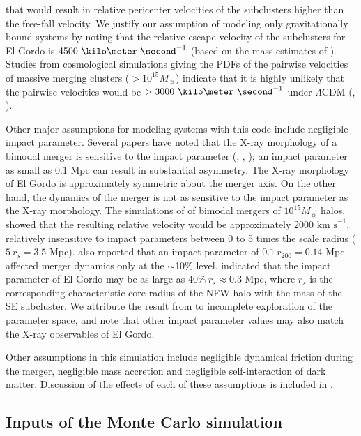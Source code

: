 that would result in relative pericenter velocities of the subclusters
higher than the free-fall velocity. We justify our assumption of
modeling only gravitationally bound systems by noting that the relative escape
velocity of the subclusters for El Gordo is
$4500~\kilo\meter~\second^{-1}$ (based on the mass estimates of
\cite{Jee13}). Studies from cosmological simulations giving the PDFs of the pairwise
velocities of massive merging clusters ($>10^{15} M_{\sun}$) indicate that it
is highly unlikely that the pairwise velocities would be $> 3000~\kilo
\meter~\second^{-1}$ under $\Lambda$CDM (\citealt{Thompson12},
\citealt{Lee2010}).\par
Other major assumptions for modeling systems with this code include negligible impact parameter.
Several papers have noted that the X-ray morphology of a bimodal merger is
sensitive to the impact parameter (\citealt{Springel2007},
\citealt{Ricker98}, \citealt{Mastropietro2008a}); an impact
parameter as small as 0.1 Mpc can result in substantial asymmetry. 
The X-ray morphology of El Gordo is approximately symmetric about the merger axis. 
On the other hand, the dynamics of the merger is not as sensitive to the
impact parameter as the X-ray morphology. The simulations of
\cite{Ricker98} of bimodal mergers of $10^{15} M_{\sun}$ halos, showed that the
resulting relative velocity would be approximately $2000 \text{ km s}^{-1}$, relatively
insensitive to impact parameters between 0 to 5 times the scale radius ($5~r_s = 3.5$ Mpc). \cite{Mastropietro2008a} also reported that
an impact parameter of $0.1~r_{200} = 0.14$ Mpc affected merger dynamics only
at the $\sim$10\% level. \citealt{Molnar14} indicated that the impact parameter of El Gordo
may be as large as $40\%~r_s \approx 0.3$ Mpc, where $r_s$ is
the corresponding characteristic core
radius of the NFW halo with the mass of the SE subcluster. We attribute
the result from \citealt{Molnar14} to incomplete exploration of
the parameter space, and note that other impact parameter values may also match the
X-ray observables of El Gordo. \par
Other assumptions in this simulation include negligible dynamical friction
during the merger, negligible mass accretion and negligible self-interaction
of dark matter. Discussion of the effects of each of these assumptions is
included in .  
\subsection{Inputs of the Monte Carlo simulation} \label{sec:inputs}
